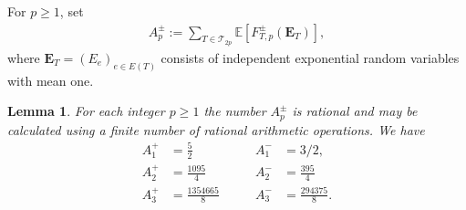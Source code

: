 \documentclass[english,11pt]{smfart}
\newcommand{\Ex}[1]{\mathbb{E}[#1]}
\newcommand{\cT}{\mathcal{T}}
\newtheorem{lemma}[theorem]{Lemma}
\numberwithin{equation}{section}
\begin{document}
For $p \ge 1$, set
\begin{align}
	\label{eq:apm}
	A_p^\pm := \sum_{T\in\cT_{2p}} \Ex{F_{T,p}^\pm(\bm E_T)},
\end{align}
where $\bm{E}_T=(E_e)_{e\in E(T)}$ consists of independent exponential random variables with mean one. 



\begin{lemma}
	\label{le:compute}
	For each integer $p \ge 1$ the number $A_p^{\pm}$ is rational and may be calculated using a finite number of rational arithmetic operations. We have
	\begin{align*}
		A_1^+ &= \frac{5}{2} & \qquad A_1^- &= 3/2, \\
		A_2^+ &= \frac{1095}{4} & \qquad A_2^- &= \frac{395}{4} \\
		A_3^+ &= \frac{1354665}{8} & \qquad A_3^- &= \frac{294375}{8}.
	\end{align*}
\end{lemma}
\end{document}
